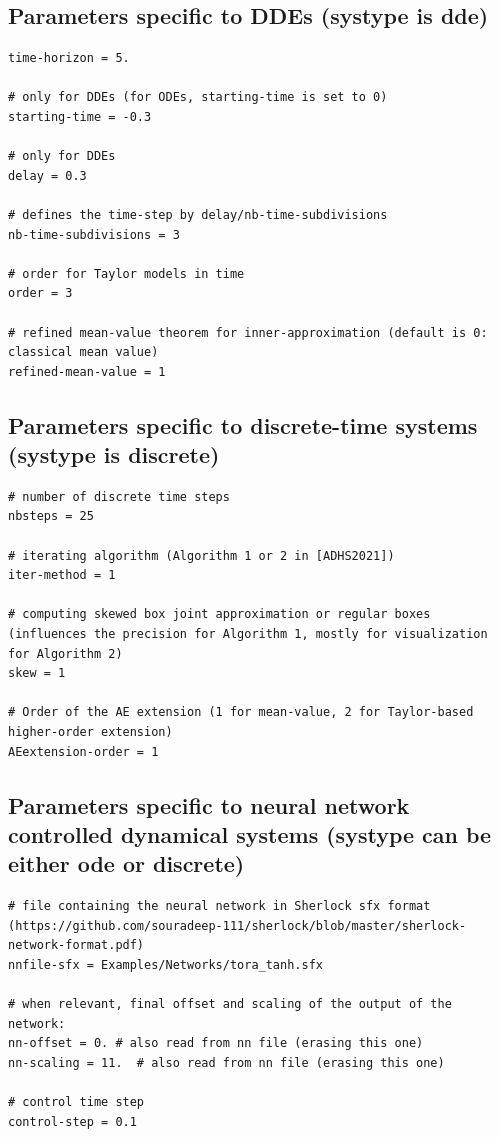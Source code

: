 \documentclass{article}
\begin{document}
\subsection{Parameters specific to DDEs (systype is dde)}

\begin{verbatim}
time-horizon = 5.

# only for DDEs (for ODEs, starting-time is set to 0)
starting-time = -0.3

# only for DDEs
delay = 0.3 

# defines the time-step by delay/nb-time-subdivisions
nb-time-subdivisions = 3

# order for Taylor models in time
order = 3

# refined mean-value theorem for inner-approximation (default is 0: classical mean value)
refined-mean-value = 1
\end{verbatim}

\subsection{Parameters specific to discrete-time systems (systype is discrete)}

\begin{verbatim}
# number of discrete time steps
nbsteps = 25

# iterating algorithm (Algorithm 1 or 2 in [ADHS2021])
iter-method = 1

# computing skewed box joint approximation or regular boxes (influences the precision for Algorithm 1, mostly for visualization for Algorithm 2)
skew = 1

# Order of the AE extension (1 for mean-value, 2 for Taylor-based higher-order extension)
AEextension-order = 1
\end{verbatim}

\subsection{Parameters specific to neural network controlled dynamical systems (systype can be either ode or discrete)}

\begin{verbatim}
# file containing the neural network in Sherlock sfx format (https://github.com/souradeep-111/sherlock/blob/master/sherlock-network-format.pdf) 
nnfile-sfx = Examples/Networks/tora_tanh.sfx

# when relevant, final offset and scaling of the output of the network:
nn-offset = 0. # also read from nn file (erasing this one)
nn-scaling = 11.  # also read from nn file (erasing this one)

# control time step
control-step = 0.1
\end{verbatim}
\end{document}
